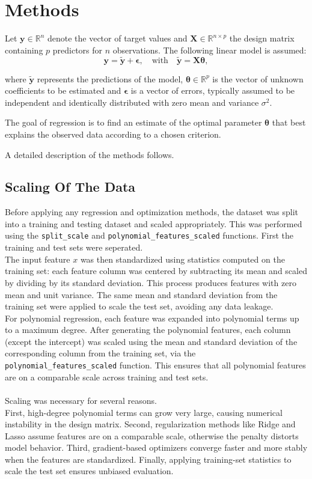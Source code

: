 \documentclass[
 reprint,            %
 amsmath,amssymb,
 aps,
]{revtex4-2}
\begin{document}
\section{Methods}
\label{sec:Methods}
 Let $\mathbf{y} \in \mathbb{R}^n$ denote the vector of target values and $\mathbf{X} \in \mathbb{R}^{n \times p}$ the design matrix containing $p$ predictors for $n$ observations. The following linear model is assumed:
$$
\mathbf{y} = \tilde{\mathbf{y}} + \boldsymbol{\epsilon}, \quad \text{with} \quad \tilde{\mathbf{y}} = \mathbf{X}\boldsymbol{\theta},
$$

where $\tilde{\mathbf{y}}$ represents the predictions of the model, $\boldsymbol{\theta} \in \mathbb{R}^p$ is the vector of unknown coefficients to be estimated and $\boldsymbol{\epsilon}$ is a vector of errors, typically assumed to be independent and identically distributed with zero mean and variance $\sigma^2$.

The goal of regression is to find an estimate of the optimal parameter $\boldsymbol{\theta}$ that best explains the observed data according to a chosen criterion. 

A detailed description of the methods follows.

\subsection{Scaling Of The Data}
Before applying any regression and optimization methods, the dataset was split into a training and testing dataset and scaled appropriately.
This was performed using the \texttt{split\_scale} and \texttt{polynomial\_features\_scaled} functions.
First the training and test sets were seperated.\\
The input feature $x$ was then standardized using statistics computed on the training set: each feature column was centered by subtracting its mean and scaled by dividing by its standard deviation.
This process produces features with zero mean and unit variance.
The same mean and standard deviation from the training set were applied to scale the test set, avoiding any data leakage.\\
For polynomial regression, each feature was expanded into polynomial terms up to a maximum degree.
After generating the polynomial features, each column (except the intercept) was scaled using the mean and standard deviation of the corresponding column from the training set, via the \texttt{polynomial\_features\_scaled} function.
This ensures that all polynomial features are on a comparable scale across training and test sets.\\\\
Scaling was necessary for several reasons.\\
First, high-degree polynomial terms can grow very large, causing numerical instability in the design matrix.
Second, regularization methods like Ridge and Lasso assume features are on a comparable scale, otherwise the penalty distorts model behavior.
Third, gradient-based optimizers converge faster and more stably when the features are standardized.
Finally, applying training-set statistics to scale the test set ensures unbiased evaluation.
\end{document}
